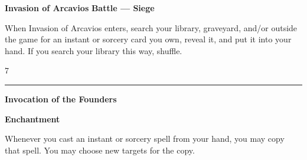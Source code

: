 \documentclass[8pt]{extarticle}
\begin{document}
{\large\textbf{Invasion of Arcavios}}
\hfill
\3\U\U

\textbf{Battle — Siege}

When Invasion of Arcavios enters, search your library, graveyard, and/or outside the game for an instant or sorcery card you own, reveal it, and put it into your hand. If you search your library this way, shuffle.

\hfill7

\vfill
\hrule
\vfill

{\large\textbf{Invocation of the Founders}}

\textbf{Enchantment}

Whenever you cast an instant or sorcery spell from your hand, you may copy that spell. You may choose new targets for the copy.
\end{document}

